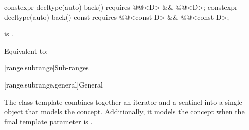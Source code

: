 %
\begin{itemdecl}
constexpr decltype(auto) back() requires @@<D> && @@<D>;
constexpr decltype(auto) back() const
  requires @@<const D> && @@<const D>;
\end{itemdecl}

\begin{itemdescr}
\pnum
\hardexpects
{} is .

\pnum
\effects
Equivalent to: 
\end{itemdescr}

[range.subrange]{Sub-ranges}

[range.subrange.general]{General}

\pnum
The  class template combines together an
iterator and a sentinel into a single object that models the
 concept. Additionally, it models the
 concept when the final template parameter is
.

